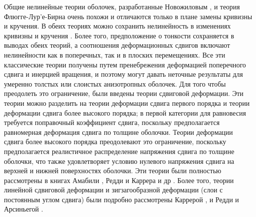 Общие нелинейные теории оболочек, разработанные Новожиловым \cite{novozhilov1953}, и теория Флюгге-Лур'е-Бирна \cite{ginsberg1973} очень похожи и отличаются только в плане замены кривизны и кручения. В обеих теориях можно сохранить нелинейность в изменениях кривизны и кручения \cite{amabili2008}. Более того, предположение о тонкости сохраняется в выводах обеих теорий, а соотношения деформационных сдвигов включают нелинейности как в поперечных, так и в плоских перемещениях. Все эти классические теории получены путем пренебрежения деформацией поперечного сдвига и инерцией вращения, и поэтому могут давать неточные результаты для умеренно толстых или слоистых анизотропных оболочек. Для того чтобы преодолеть это ограничение, были введены теории сдвиговой деформации. Эти теории можно разделить на теории деформации сдвига первого порядка и теории деформации сдвига более высокого порядка; в первой категории для равновесия требуется поправочный коэффициент сдвига, поскольку предполагается равномерная деформация сдвига по толщине оболочки. Теории деформации сдвига более высокого порядка преодолевают это ограничение, поскольку предполагается реалистичное распределение напряжения сдвига по толщине оболочки, что также удовлетворяет условию нулевого напряжения сдвига на верхней и нижней поверхностях оболочки. Эти теории были полностью рассмотрены в книгах Амабили \cite{amabili2008}, Редди \cite{reddy2004} и Каррера и др \cite{carreranali2011}. Более того, теории линейной сдвиговой деформации и зигзагообразной деформации (слои с постоянным углом сдвига) были подробно рассмотрены Каррерой \cite{carrera2002, carrera2003},  и Редди и Арсиньегой \cite{reddyarciniega2004}.


